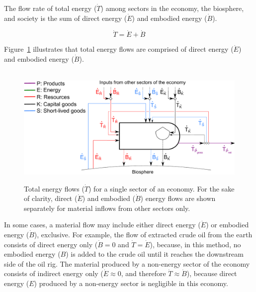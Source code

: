 The flow rate of total energy 
($\dot{T}$)
among sectors in 
the economy, the biosphere, and society is the sum of
direct energy ($\dot{E}$) and embodied 
energy ($\dot{B}$).

\begin{equation} \label{eq:T_dot_def}
	\dot{T} = \dot{E} + \dot{B}
\end{equation}

\noindent Figure~\ref{fig:embodied_single_producer} illustrates
that total energy flows are comprised of
direct energy ($\dot{E}$) and embodied energy ($\dot{B}$). 

\begin{figure}[!ht]
	\centering\
	\includegraphics[width=.9\textwidth]{Part_1/Chapter_Embodied/images/PERKS_basic_unit_embodied_energy_content.pdf}
	\caption[Total energy flows for a single sector]{Total energy flows 
	($\dot{T}$) for a single sector of an economy. 
	For the sake of clarity, 
	direct ($\dot{E}$) and embodied ($\dot{B}$) energy flows
	are shown separately for material inflows from other sectors only.
}
\label{fig:embodied_single_producer}
\end{figure}

In some cases, a material flow may include 
either direct energy ($\dot{E}$) 
or embodied energy ($\dot{B}$), exclusive. 
For example, the flow of extracted crude oil from the earth 
consists of direct energy only ($\dot{B} = 0$ and $\dot{T} = \dot{E}$), 
because, in this method, no embodied energy ($B$) is added 
to the crude oil until it reaches the downstream side of the oil rig.
The material produced by a non-energy sector of the economy 
consists of indirect energy only ($\dot{E} \approx 0$, 
and therefore $\dot{T} \approx \dot{B}$), 
because direct energy ($E$) produced by 
a non-energy sector is negligible in this economy. 

